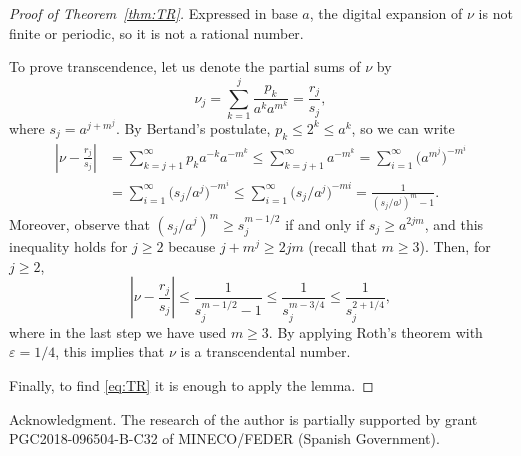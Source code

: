 \documentclass{article}
\theoremstyle{plain}
\begin{document}
\begin{proof}[Proof of Theorem~\ref{thm:TR}]
Expressed in base $a$, the digital expansion of $\nu$ is not finite or periodic, so it is not a rational number.

To prove transcendence, let us denote the partial sums of $\nu$ by
\[
  \nu_j = \sum_{k=1}^{j} \frac{p_k}{a^k a^{m^k}} = \frac{r_j}{s_j},
\]
where 
$s_j = a^{j+m^j}$. 
By Bertand's postulate, $p_k \le 2^k \le a^k$, so we can write
\begin{align*}
  \left| \nu - \frac{r_j}{s_j} \right|
  &= \sum_{k=j+1}^{\infty} p_k a^{-k} a^{-m^k} 
  \le \sum_{k=j+1}^{\infty} a^{-m^k} 
  = \sum_{i=1}^{\infty} \big(a^{m^j}\big)^{-m^i} \\
  &= \sum_{i=1}^{\infty} \big(s_j/a^j\big)^{-m^i} 
  \le \sum_{i=1}^{\infty} \big(s_j/a^j\big)^{-mi} 
  = \frac{1}{(s_j/a^j)^m-1}.
\end{align*}
Moreover, observe that $(s_j/a^j)^m \ge s_j^{m-1/2}$ if and only if $s_j \ge a^{2jm}$, and this inequality holds for $j \ge 2$ because $j+m^j \ge 2jm$ (recall that $m\ge3$). Then, for $j \ge 2$, 
\[
  \left| \nu - \frac{r_j}{s_j} \right| 
  \le \frac{1}{s_j^{m-1/2}-1} 
  \le \frac{1}{s_j^{m-3/4}} 
  \le \frac{1}{s_j^{2+1/4}},
\]
where in the last step we have used $m \ge 3$. 
By applying Roth's theorem with $\varepsilon=1/4$, this implies that $\nu$ is a transcendental number.

Finally, to find \eqref{eq:TR} it is enough to apply the lemma.
\end{proof}

\begin{paragraph}{Acknowledgment.}
The research of the author is partially supported 
by grant PGC2018-096504-B-C32 of MINECO/FEDER
 (Spanish Government).
\end{paragraph}
\end{document}
